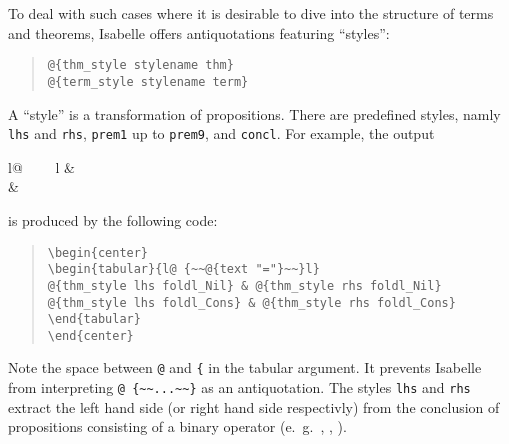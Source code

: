 \begin{isabellebody}
\begin{isamarkuptext}
  To deal with such cases where it is desirable to dive into the structure
  of terms and theorems, Isabelle offers antiquotations featuring
  ``styles'':

    \begin{quote}
    \verb!@!\verb!{thm_style stylename thm}!\\
    \verb!@!\verb!{term_style stylename term}!
    \end{quote}

  A ``style'' is a transformation of propositions. There are predefined
  styles, namly \verb!lhs! and \verb!rhs!, \verb!prem1! up to \verb!prem9!, and \verb!concl!.
  For example, 
  the output
  \begin{center}
  \begin{tabular}{l@ {~~\isa{{\isacharequal}}~~}l}
   & \\
   & 
  \end{tabular}
  \end{center}
  is produced by the following code:
  \begin{quote}
    \verb!\begin{center}!\\
    \verb!\begin{tabular}{l@ {~~!\verb!@!\verb!{text "="}~~}l}!\\
    \verb!@!\verb!{thm_style lhs foldl_Nil} & @!\verb!{thm_style rhs foldl_Nil}!\\
    \verb!@!\verb!{thm_style lhs foldl_Cons} & @!\verb!{thm_style rhs foldl_Cons}!\\
    \verb!\end{tabular}!\\
    \verb!\end{center}!
  \end{quote}
  Note the space between \verb!@! and \verb!{! in the tabular argument.
  It prevents Isabelle from interpreting \verb!@ {~~...~~}! 
  as an antiquotation. The styles \verb!lhs! and \verb!rhs!
  extract the left hand side (or right hand side respectivly) from the
  conclusion of propositions consisting of a binary operator
  (e.~g.~\isa{{\isacharequal}}, \isa{{\isasymequiv}}, \isa{{\isacharless}}).


\end{isamarkuptext}
\end{isabellebody}
